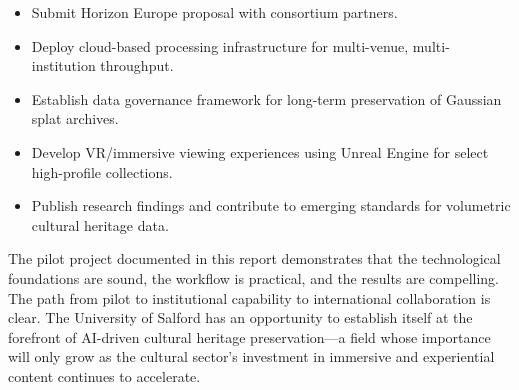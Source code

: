 \begin{itemize}
  \item Submit Horizon Europe proposal with consortium partners.
  \item Deploy cloud-based processing infrastructure for multi-venue, multi-institution throughput.
  \item Establish data governance framework for long-term preservation of Gaussian splat archives.
  \item Develop VR/immersive viewing experiences using Unreal Engine for select high-profile collections.
  \item Publish research findings and contribute to emerging standards for volumetric cultural heritage data.
\end{itemize}

\bigskip

The pilot project documented in this report demonstrates that the technological foundations are sound, the workflow is practical, and the results are compelling. The path from pilot to institutional capability to international collaboration is clear. The University of Salford has an opportunity to establish itself at the forefront of AI-driven cultural heritage preservation---a field whose importance will only grow as the cultural sector's investment in immersive and experiential content continues to accelerate.
